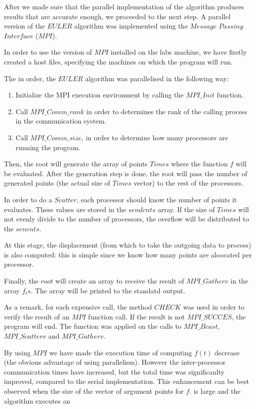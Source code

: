 After we made sure that the parallel implementation of the algorithm produces results that
are accurate enough, we proceeded to the next step.
A parallel version of the $EULER$ algorithm was implemented using the $Message$ $Passing$ $Interface$ ($MPI$).

In order to use the version of $MPI$ installed on the labs machine, we have firstly created a host files,
specifying  the machines on which the program will run.

The in order, the $EULER$ algorithm was parallelised in the following way:
\begin{enumerate}
 \item{Initialize the MPI execution environment by calling the $MPI\_Init$ function.}
 \item{Call $MPI\_Comm\_rank$ in order to determines the rank of the calling process in the communication system.}
 \item{Call $MPI\_Comm\_size$, in order to determine how many processors are running the program.}
\end{enumerate}

Then, the root will generate the array of points $Times$ where the function $f$ will be evaluated.
After the generation step is done, the root will pass the number of generated points (the actual size of 
$Times$ vector) to the rest of the processors.
\newline

In order to do a $Scatter$, each processor should know the number of points it evaluates. These
values are stored in the $sendcnts$ array. If the size of $Times$ will not evenly divide to the
number of processors, the overflow will be distributed to the $sencnts$.

At this stage, the displacement (from which to take the outgoing data to process) is also computed: 
this is simple since we know how many points are aloocated per processor. 


Finally, the $root$ will create an array to receive the result of $MPI\_Gatherv$ in the array $f_ts$.
The array will be printed to the standatd output.

As a remark, for each expensive call, the method $CHECK$ was used in order to verify the result of an $MPI$ function call. 
If the result is not $MPI\_SUCCES$, the program will end. The function was applied on the calls to $MPI\_Bcast$, $MPI\_Scatterv$  and $MPI\_Gatherv$.

By using $MPI$ we have made the execution time of computing $f(t)$ decrease (the obvious advantage of using parallelism). 
However the inter-processor communication times have increased, but the total time was significanlty improved, compared
to the serial implementation. This enhancement can be best observed when the size of the vector of argument points for $f$. 
is large and the algorithm executes an


